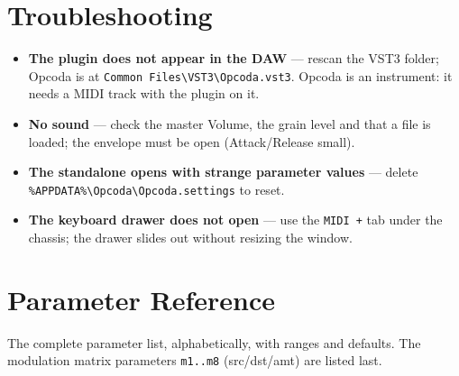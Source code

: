 \documentclass[11pt,a4paper]{article}
\begin{document}
\section{Troubleshooting}
\begin{itemize}
  \item \textbf{The plugin does not appear in the DAW} --- rescan the VST3
  folder; Opcoda is at \texttt{Common Files\textbackslash VST3\textbackslash Opcoda.vst3}.
  Opcoda is an instrument: it needs a MIDI track with the plugin on it.
  \item \textbf{No sound} --- check the master Volume, the grain level and
  that a file is loaded; the envelope must be open (Attack/Release small).
  \item \textbf{The standalone opens with strange parameter values} --- delete
  \texttt{\%APPDATA\%\textbackslash Opcoda\textbackslash Opcoda.settings} to reset.
  \item \textbf{The keyboard drawer does not open} --- use the \texttt{MIDI +}
  tab under the chassis; the drawer slides out without resizing the window.
\end{itemize}

\clearpage
\appendix
\section{Parameter Reference}
The complete parameter list, alphabetically, with ranges and defaults. The
modulation matrix parameters \texttt{m1..m8} (src/dst/amt) are listed last.
\end{document}
